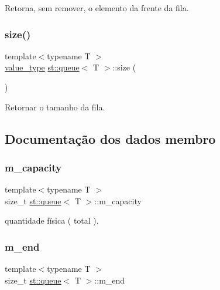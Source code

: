 Retorna, sem remover, o elemento da frente da fila. 

\mbox{\label{classst_1_1queue_a1b689674da153552513628f5347b5152}} 
\subsubsection{\texorpdfstring{size()}{size()}}
{\footnotesize\ttfamily template$<$typename T $>$ \\
\hyperlink{classst_1_1queue_a2a0fa1d9b72bfdad9acf67a92146b143}{value\+\_\+type} \hyperlink{classst_1_1queue}{st\+::queue}$<$ T $>$\+::size (\begin{DoxyParamCaption}{ }\end{DoxyParamCaption})\hspace{0.3cm}{\ttfamily [inline]}}



Retornar o tamanho da fila. 



\subsection{Documentação dos dados membro}
\mbox{\label{classst_1_1queue_ad38c7e269766103855c22285ab6f72c2}} 
\subsubsection{\texorpdfstring{m\+\_\+capacity}{m\_capacity}}
{\footnotesize\ttfamily template$<$typename T $>$ \\
size\+\_\+t \hyperlink{classst_1_1queue}{st\+::queue}$<$ T $>$\+::m\+\_\+capacity\hspace{0.3cm}{\ttfamily [private]}}



quantidade física ( total ). 

\mbox{\label{classst_1_1queue_a3ec689ca3200dccc8482fa205c5797f1}} 
\subsubsection{\texorpdfstring{m\+\_\+end}{m\_end}}
{\footnotesize\ttfamily template$<$typename T $>$ \\
size\+\_\+t \hyperlink{classst_1_1queue}{st\+::queue}$<$ T $>$\+::m\+\_\+end\hspace{0.3cm}{\ttfamily [private]}}



